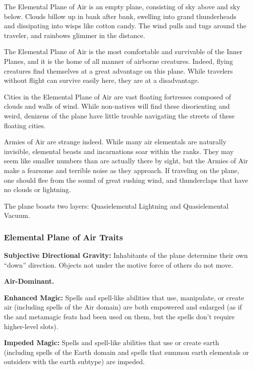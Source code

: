 The Elemental Plane of Air is an empty plane, consisting of sky above and sky below. Clouds billow up in bank after bank, swelling into grand thunderheads and dissipating into wisps like cotton candy. The wind pulls and tugs around the traveler, and rainbows glimmer in the distance.

The Elemental Plane of Air is the most comfortable and survivable of the Inner Planes, and it is the home of all manner of airborne creatures. Indeed, flying creatures find themselves at a great advantage on this plane. While travelers without flight can survive easily here, they are at a disadvantage.

Cities in the Elemental Plane of Air are vast floating fortresses composed of clouds and walls of wind. While non-natives will find these disorienting and weird, denizens of the plane have little trouble navigating the streets of these floating cities.

Armies of Air are strange indeed. While many air elementals are naturally invisible, elemental beasts and incarnations soar within the ranks. They may seem like smaller numbers than are actually there by sight, but the Armies of Air make a fearsome and terrible noise as they approach. If traveling on the plane, one should flee from the sound of great rushing wind, and thunderclaps that have no clouds or lightning.

The plane boasts two layers: Quasielemental Lightning and Quasielemental Vacuum.


\subsubsection{Elemental Plane of Air Traits}
\begin{itemize*}
\item \textbf{Subjective Directional Gravity:} Inhabitants of the plane determine their own ``down'' direction. Objects not under the motive force of others do not move.
\item \textbf{Air-Dominant.}
\item \textbf{Enhanced Magic:} Spells and spell-like abilities that use, manipulate, or create air (including spells of the Air domain) are both empowered and enlarged (as if the  and  metamagic feats had been used on them, but the spells don't require higher-level slots).
\item \textbf{Impeded Magic:} Spells and spell-like abilities that use or create earth (including spells of the Earth domain and spells that summon earth elementals or outsiders with the earth subtype) are impeded.
\end{itemize*}

